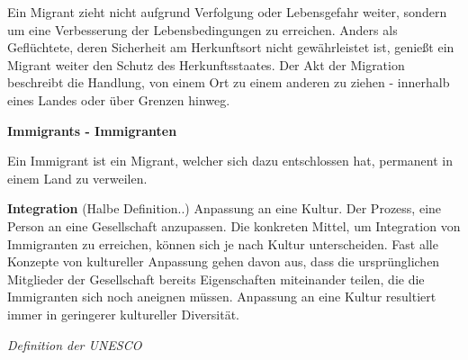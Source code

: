 Ein Migrant zieht nicht aufgrund Verfolgung oder Lebensgefahr weiter, sondern um eine Verbesserung der Lebensbedingungen zu erreichen. Anders als Geflüchtete, deren Sicherheit am Herkunftsort nicht gewährleistet ist, genießt ein Migrant weiter den Schutz des Herkunftsstaates.
Der Akt der Migration beschreibt die Handlung, von einem Ort zu einem anderen zu ziehen - innerhalb eines Landes oder über Grenzen hinweg.

\newline
\textbf{Immigrants - Immigranten}

Ein Immigrant ist ein Migrant, welcher sich dazu entschlossen hat, permanent in einem Land zu verweilen.

\newline
\textbf{Integration}
(Halbe Definition..)
Anpassung an eine Kultur. Der Prozess, eine Person an eine Gesellschaft anzupassen. Die konkreten Mittel, um Integration von Immigranten zu erreichen, können sich je nach Kultur unterscheiden. Fast alle Konzepte von kultureller Anpassung gehen davon aus, dass die ursprünglichen Mitglieder der Gesellschaft bereits Eigenschaften miteinander teilen, die die Immigranten sich noch aneignen müssen. Anpassung an eine Kultur resultiert immer in geringerer kultureller Diversität.
\newline
\centerline{\textit{Definition der UNESCO}}





